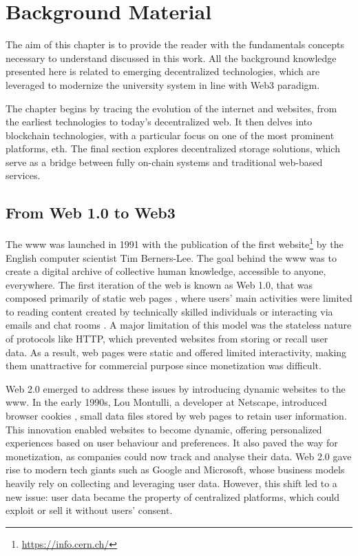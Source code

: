 \chapter{Background Material}
\label{chap:background}
The aim of this chapter is to provide the reader with the fundamentals concepts necessary to understand discussed in this work. All the background knowledge presented here is related to emerging decentralized technologies, which are leveraged to modernize the university system in line with Web3 paradigm.

The chapter begins by tracing the evolution of the internet and websites, from the earliest technologies to today's decentralized web. It then delves into blockchain technologies, with a particular focus on one of the most prominent platforms, \acrlong{eth}. The final section explores decentralized storage solutions, which serve as a bridge between fully on-chain systems and traditional web-based services.

\section{From Web 1.0 to Web3}
The \acrfull{www} \cite{berners1992world} was launched in 1991 with the publication of the first website\footnote{\url{https://info.cern.ch/}} by the English computer scientist Tim Berners-Lee. The goal behind the \acrshort{www} was to create a digital archive of collective human knowledge, accessible to anyone, everywhere. The first iteration of the web is known as Web 1.0, that was composed primarily of static web pages \cite{choudhury2014world}, where users' main activities were limited to reading content created by technically skilled individuals or interacting via emails and chat rooms \cite{murray2023promise}. A major limitation of this model was the stateless nature of protocols like HTTP, which prevented websites from storing or recall user data. As a result, web pages were static and offered limited interactivity, making them unattractive for commercial purpose since monetization was difficult.

Web 2.0 emerged to address these issues by introducing dynamic websites to the \acrshort{www}. In the early 1990s, Lou Montulli, a developer at Netscape, introduced browser cookies \cite{kristol1997rfc2109}, small data files stored by web pages to retain user information. This innovation enabled websites to become dynamic, offering personalized experiences based on user behaviour and preferences. It also paved the way for monetization, as companies could now track and analyse their data. Web 2.0 gave rise to modern tech giants such as Google and Microsoft, whose business models heavily rely on collecting and leveraging user data. However, this shift led to a new issue: user data became the property of centralized platforms, which could exploit or sell it without users' consent.

